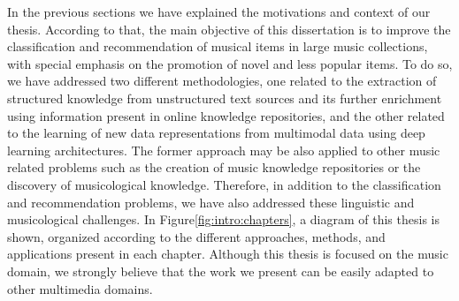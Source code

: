 In the previous sections we have explained the motivations and context of our thesis. According to that, the main objective of this dissertation is to improve the classification and recommendation of musical items in large music collections, with special emphasis on the promotion of novel and less popular items. To do so, we have addressed two different methodologies, one related to the extraction of structured knowledge from unstructured text sources and its further enrichment using information present in online knowledge repositories, and the other related to the learning of new data representations from multimodal data using deep learning architectures. The former approach may be also applied to other music related problems such as the creation of music knowledge repositories or the discovery of musicological knowledge. %
Therefore, in addition to the classification and recommendation problems, we have also addressed these linguistic and musicological challenges.
In Figure\ref{fig:intro:chapters}, a diagram of this thesis is shown, organized according to the different approaches, methods, and applications present in each chapter. Although this thesis is focused on the music domain, we strongly believe that the work we present can be easily adapted to other multimedia domains. 



